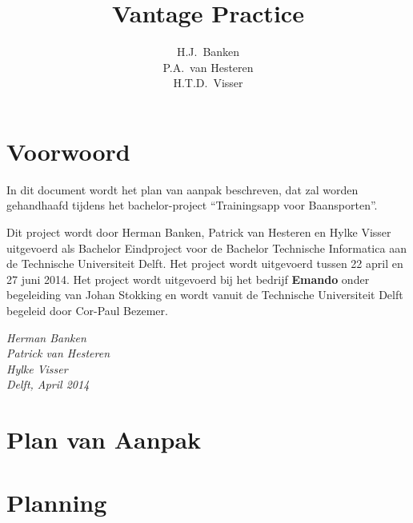 \documentclass[dutch]{style/tudelft-report}
\begin{document}

\frontmatter

\title[Bachelorproject \\ ~ \\ Plan van Aanpak]{Vantage Practice}
\author{H.J.\ Banken \\ P.A.\ van Hesteren \\ H.T.D.\ Visser}



\chapter{Voorwoord}
In dit document wordt het plan van aanpak beschreven, dat zal worden gehandhaafd tijdens het bachelor-project “Trainingsapp voor Baansporten”. 

\bigskip

\noindent
Dit project wordt door Herman Banken, Patrick van Hesteren en Hylke Visser uitgevoerd als Bachelor Eindproject voor de Bachelor Technische Informatica aan de Technische Universiteit Delft. Het project wordt uitgevoerd tussen 22 april en 27 juni 2014. Het project wordt uitgevoerd bij het bedrijf \textbf{Emando} onder begeleiding van Johan Stokking en wordt vanuit de Technische Universiteit Delft begeleid door Cor-Paul Bezemer. 

\bigskip

\begin{flushright}
{\makeatletter\itshape
    Herman Banken \\
    Patrick van Hesteren \\
    Hylke Visser \\
    Delft, April 2014
\makeatother}
\end{flushright}

\tableofcontents

\mainmatter

\chapter{Plan van Aanpak} \label{ch:plan-van-aanpak} 

\appendix



\chapter{Planning} \label{ch:planning} 

%
\end{document}
